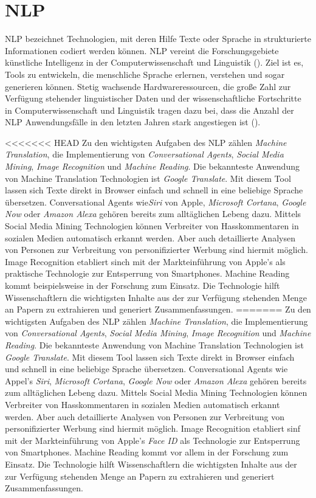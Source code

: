 \section{NLP}

\ac{NLP} bezeichnet Technologien, mit deren Hilfe Texte oder Sprache in strukturierte Informationen codiert werden können. \ac{NLP} vereint die Forschungsgebiete künstliche Intelligenz in der Computerwissenschaft und Linguistik (\cite[vgl.][1]{ITWISSEN}). Ziel ist es, Tools zu entwickeln, die menschliche Sprache erlernen, verstehen und sogar generieren können. Stetig wachsende Hardwareressourcen, die große Zahl zur Verfügung stehender linguistischer Daten und der wissenschaftliche Fortschritte in Computerwissenschaft und Linguistik tragen dazu bei, dass die Anzahl der \ac{NLP} Anwendungsfälle in den letzten Jahren stark angestiegen ist (\cite[vgl.][1]{HIRSCHBERG}). 
\par
<<<<<<< HEAD
Zu den wichtigsten Aufgaben des \ac{NLP} zählen \textit{Machine Translation}, die Implementierung von \textit{Conversational Agents}, \textit{Social Media Mining}, \textit{Image Recognition} und \textit{Machine Reading}. Die bekannteste Anwendung  von Machine Translation Technologien ist \textit{Google Translate}. Mit diesem Tool lassen sich Texte direkt in Browser einfach und schnell in eine beliebige Sprache übersetzen. Conversational Agents wie\textit{Siri} von Apple, \textit{Microsoft Cortana}, \textit{Google Now} oder \textit{Amazon Alexa} gehören bereits zum alltäglichen Lebeng dazu. Mittels Social Media Mining Technologien können Verbreiter von Hasskommentaren in sozialen Medien automatisch erkannt werden. Aber auch detaillierte Analysen von Personen zur Verbreitung von personifizierter Werbung sind hiermit möglich. Image Recognition etabliert sinch mit der Markteinführung von Apple's  als praktische Technologie zur Entsperrung von Smartphones. Machine Reading kommt beispielsweise in der Forschung zum Einsatz. Die Technologie hilft Wissenschaftlern die wichtigsten Inhalte aus der zur Verfügung stehenden Menge an Papern zu extrahieren und generiert Zusammenfassungen.
=======
Zu den wichtigsten Aufgaben des \ac{NLP} zählen \textit{Machine Translation}, die Implementierung von \textit{Conversational Agents}, \textit{Social Media Mining}, \textit{Image Recognition} und \textit{Machine Reading}. Die bekannteste Anwendung  von Machine Translation Technologien ist \textit{Google Translate}. Mit diesem Tool lassen sich Texte direkt in Browser einfach und schnell in eine beliebige Sprache übersetzen. Conversational Agents wie Appel's\textit{ Siri}, \textit{Microsoft Cortana}, \textit{Google Now} oder \textit{Amazon Alexa} gehören bereits zum alltäglichen Lebeng dazu. Mittels Social Media Mining Technologien können Verbreiter von Hasskommentaren in sozialen Medien automatisch erkannt werden. Aber auch detaillierte Analysen von Personen zur Verbreitung von personifizierter Werbung sind hiermit möglich. Image Recognition etabliert sinf mit der Markteinführung von Apple's \textit{Face ID} als Technologie zur Entsperrung von Smartphones. Machine Reading kommt vor allem in der Forschung zum Einsatz. Die Technologie hilft Wissenschaftlern die wichtigsten Inhalte aus der zur Verfügung stehenden Menge an Papern zu extrahieren und generiert Zusammenfassungen.
